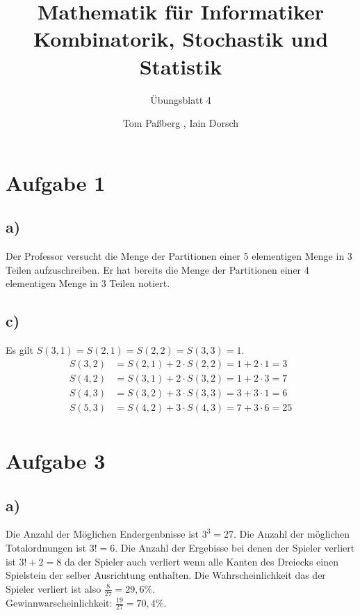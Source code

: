 \documentclass[a4paper]{scrartcl}
\title{Mathematik für Informatiker \\ Kombinatorik, Stochastik und Statistik}
\subtitle{Übungsblatt 4}
\author{Tom Paßberg , Iain Dorsch}
\date{}
\begin{document}
\maketitle

\newpage

\section*{Aufgabe 1}
\subsection*{a)}
Der Professor versucht die Menge der Partitionen einer 5 elementigen Menge in 3 Teilen aufzuschreiben.
Er hat bereits die Menge der Partitionen einer 4 elementigen Menge in 3 Teilen notiert.

\subsection*{c)}
Es gilt $ S(3,1) = S(2,1) = S(2,2) = S(3,3) = 1$.
\begin{align*}
    S(3,2) &= S(2,1) + 2 \cdot S(2,2) = 1 + 2 \cdot 1 = 3 \\
    S(4,2) &= S(3,1) + 2 \cdot S(3,2) = 1 + 2 \cdot 3 = 7 \\
    S(4,3) &= S(3,2) + 3 \cdot S(3,3) = 3 + 3 \cdot 1 = 6 \\
    S(5,3) &= S(4,2) + 3 \cdot S(4,3) = 7 + 3 \cdot 6 = 25 \\
\end{align*}

\section*{Aufgabe 3}
\subsection*{a)}
Die Anzahl der Möglichen Endergenbnisse ist $3^3 = 27$. Die Anzahl der möglichen Totalordnungen ist $3! = 6$.
Die Anzahl der Ergebisse bei denen der Spieler verliert ist $3! + 2 = 8$ da der Spieler auch verliert wenn alle Kanten des Dreiecks einen Spielstein der selber Ausrichtung enthalten.
Die Wahrscheinlichkeit das der Spieler verliert ist also $\frac{8}{27} = 29,6\%$. \\
Gewinnwarscheinlichkeit: $\frac{19}{27} = 70,4\%$.
\end{document}
